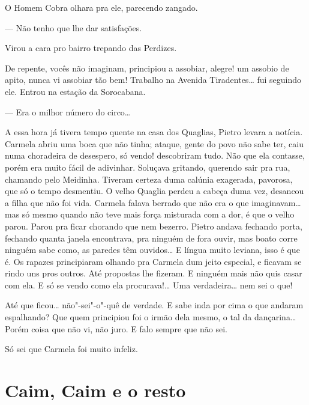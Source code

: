 \begin{linenumbers}
O Homem Cobra olhara pra ele, parecendo zangado.

--- Não tenho que lhe dar satisfações.

Virou a cara pro bairro trepando das Perdizes.

De repente, vocês não imaginam, principiou a assobiar, alegre! um
assobio de apito, nunca vi assobiar tão bem! Trabalho na Avenida
Tiradentes\ldots{} fui seguindo ele. Entrou na estação da Sorocabana.

--- Era o milhor número do circo\ldots{}

A essa hora já tivera tempo quente na casa dos Quaglias, Pietro levara a
notícia. Carmela abriu uma boca que não tinha; ataque, gente do povo não
sabe ter, caiu numa choradeira de desespero, só vendo! descobriram tudo.
Não que ela contasse, porém era muito fácil de adivinhar. Soluçava
gritando, querendo sair pra rua, chamando pelo Meidinha. Tiveram certeza
duma calúnia exagerada, pavorosa, que só o tempo desmentiu. O velho
Quaglia perdeu a cabeça duma vez, desancou a filha que não foi vida.
Carmela falava berrado que não era o que imaginavam\ldots{} mas só mesmo
quando não teve mais força misturada com a dor, é que o velho parou.
Parou pra ficar chorando que nem bezerro. Pietro andava fechando porta,
fechando quanta janela encontrava, pra ninguém de fora ouvir, mas boato
corre ninguém sabe como, as paredes têm ouvidos\ldots{} E língua muito
leviana, isso é que é. Os rapazes principiaram olhando pra Carmela dum
jeito especial, e ficavam se rindo uns pros outros. Até propostas lhe
fizeram. E ninguém mais não quis casar com ela. E só se vendo como ela
procurava!\ldots{} Uma verdadeira\ldots{} nem sei o que!

Até que ficou\ldots{} não"-sei"-o"-quê de verdade. E sabe inda por cima o que
andaram espalhando? Que quem principiou foi o irmão dela mesmo, o tal da
dançarina\ldots{} Porém coisa que não vi, não juro. E falo sempre que não
sei.

Só sei que Carmela foi muito infeliz.
\end{linenumbers}

\chapter{Caim, Caim e o resto}

